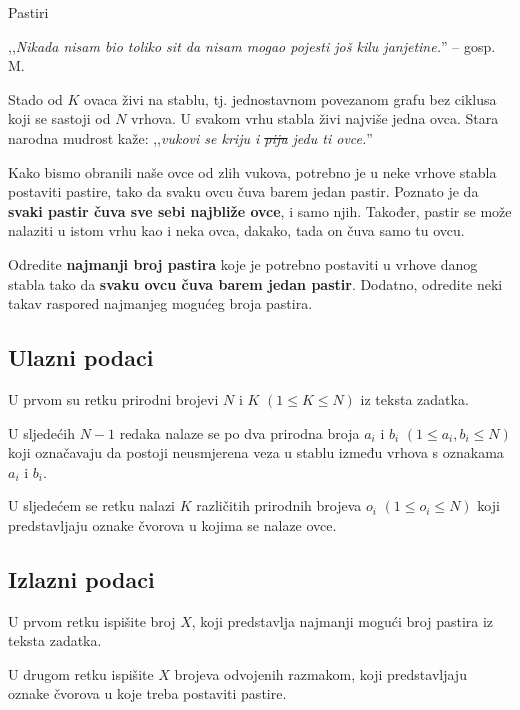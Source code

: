 \begin{statement}[
  problempoints=100,
  timelimit=1 sekunda,
  memorylimit=512 MiB,
]{Pastiri}

,,\textit{Nikada nisam bio toliko sit da nisam mogao pojesti još kilu janjetine.}''
  -- gosp. M.

Stado od $K$ ovaca živi na stablu, tj. jednostavnom povezanom grafu bez ciklusa
koji se sastoji od $N$ vrhova.
U svakom vrhu stabla živi najviše jedna ovca.
Stara narodna mudrost kaže: ,,\textit{vukovi
se kriju i \sout{piju} jedu ti ovce.}'' 

Kako bismo obranili naše ovce od zlih
vukova, potrebno je u neke vrhove stabla postaviti pastire, tako da svaku
ovcu čuva barem jedan pastir. Poznato je da \textbf{svaki pastir čuva sve
sebi najbliže ovce}, i samo njih. Također, pastir se može nalaziti u istom vrhu
kao i neka ovca, dakako, tada on čuva samo tu ovcu.

Odredite \textbf{najmanji broj pastira} koje je potrebno postaviti u vrhove danog
stabla tako da \textbf{svaku ovcu čuva barem jedan pastir}. Dodatno, odredite neki takav
raspored najmanjeg mogućeg broja pastira.

\subsection*{Ulazni podaci}
U prvom su retku prirodni brojevi $N$ i $K$ $(1 \le K \le N)$ iz teksta zadatka.

U sljedećih $N-1$ redaka nalaze se po dva prirodna broja $a_i$ i $b_i$ $(1 \le a_i, b_i \le N)$ koji
označavaju da postoji neusmjerena veza u stablu između vrhova s oznakama $a_i$ i $b_i$.

U sljedećem se retku nalazi $K$ različitih prirodnih brojeva $o_i$ $(1 \le o_i \le N)$ koji
predstavljaju oznake čvorova u kojima se nalaze ovce.

\subsection*{Izlazni podaci}
U prvom retku ispišite broj $X$, koji predstavlja najmanji mogući broj pastira
iz teksta zadatka.

U drugom retku ispišite $X$ brojeva odvojenih razmakom, koji predstavljaju oznake
čvorova u koje treba postaviti pastire.


\end{statement}
